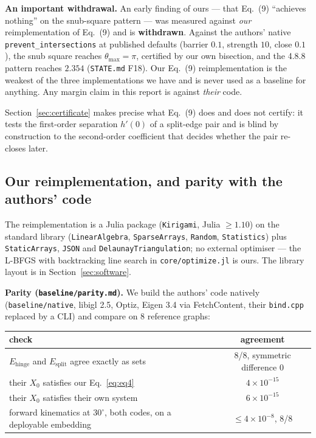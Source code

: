 \documentclass[11pt,a4paper]{article}
\theoremstyle{definition}
\newcommand{\Esplit}{E_{\mathrm{split}}}
\newcommand{\Ehinge}{E_{\mathrm{hinge}}}
\newcommand{\file}[1]{\texttt{\small #1}}
\begin{document}
\textbf{An important withdrawal.} An early finding of ours --- that Eq.~(9) ``achieves
nothing'' on the snub-square pattern --- was measured against \emph{our} reimplementation of
Eq.~(9) and is \textbf{withdrawn}. Against the authors' native \file{prevent\_intersections}
at published defaults (barrier $0.1$, strength $10$, close $0.1$), the snub square reaches
$\theta_{\max}=\pi$, certified by our own bisection, and the 4.8.8 pattern reaches $2.354$
(\file{STATE.md} F18). Our Eq.~(9) reimplementation is the weakest of the three
implementations we have and is never used as a baseline for anything. Any margin claim in
this report is against \emph{their} code.

Section~\ref{sec:certificate} makes precise what Eq.~(9) does and does not certify: it
tests the first-order separation $h'(0)$ of a split-edge pair and is blind by construction
to the second-order coefficient that decides whether the pair re-closes later.

\subsection{Our reimplementation, and parity with the authors' code}

The reimplementation is a Julia package (\file{Kirigami}, Julia $\geq 1.10$) on the standard library
(\file{LinearAlgebra}, \file{SparseArrays}, \file{Random}, \file{Statistics}) plus \file{StaticArrays}, \file{JSON}
and \file{DelaunayTriangulation}; no external optimiser --- the L-BFGS with backtracking line search in
\file{core/optimize.jl} is ours. The library layout is in Section~\ref{sec:software}.

\textbf{Parity (\file{baseline/parity.md}).} We build the authors' code natively
(\file{baseline/native}, libigl 2.5, Optiz, Eigen 3.4 via FetchContent, their \file{bind.cpp}
replaced by a CLI) and compare on 8 reference graphs:

\begin{center}
\small
\begin{tabular}{@{}lc@{}}
\toprule
check & agreement \\
\midrule
$\Ehinge$ and $\Esplit$ agree exactly as sets & 8/8, symmetric difference 0 \\
their $X_0$ satisfies our Eq.~\eqref{eq:eq4} & $4\times10^{-15}$ \\
their $X_0$ satisfies their own system & $6\times10^{-15}$ \\
forward kinematics at $30^\circ$, both codes, on a deployable embedding & $\le 4\times10^{-8}$, 8/8 \\
\bottomrule
\end{tabular}
\end{center}
\end{document}
